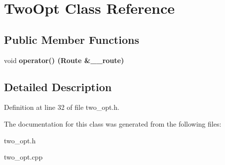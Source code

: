 \section{Two\-Opt Class Reference}
\label{class_two_opt}
\subsection*{Public Member Functions}
\begin{CompactItemize}
\item 
void \bf{operator()} (Route \&\_\-\_\-route)\label{class_two_opt_ff87d1649a33d42a6d64e8d314ed1af0}

\end{CompactItemize}


\subsection{Detailed Description}




Definition at line 32 of file two\_\-opt.h.

The documentation for this class was generated from the following files:\begin{CompactItemize}
\item 
two\_\-opt.h\item 
two\_\-opt.cpp\end{CompactItemize}
